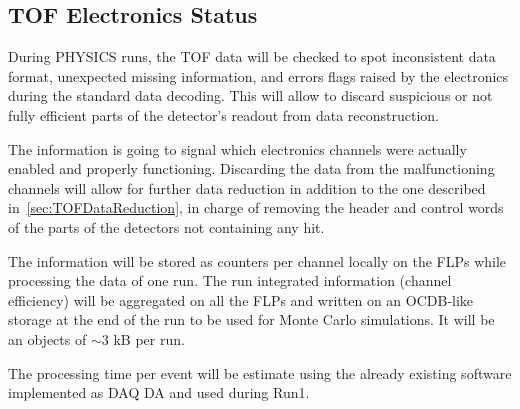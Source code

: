 \subsection{TOF Electronics Status}
\label{sec:TOFElectronicsStatus}
During PHYSICS runs, the TOF data will be checked to spot inconsistent data format, unexpected missing information, 
and errors flags raised by the electronics during the standard data decoding. This will allow to discard suspicious or not 
fully efficient parts of the detector's readout from data reconstruction. 

The information is going to signal which electronics channels were
actually enabled and properly functioning. Discarding the data from the malfunctioning channels will allow for 
further data reduction in addition to the one described in~\ref{sec:TOFDataReduction},
in charge of removing the header and control words of the parts of the detectors not containing any hit. 

The information will be stored as counters per channel locally on the FLPs while processing the data of one run. 
The run integrated information (channel efficiency) will be aggregated on all the FLPs and written on an OCDB-like 
storage at the end of the run to be used for Monte Carlo simulations. 
It will be an objects of $\sim 3$ kB per run.

The processing time per event will be estimate using the already existing software implemented as DAQ DA and used 
during Run1.

